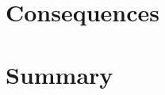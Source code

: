 \documentclass[prd,twocolumn,aps,nobibnotes,superscriptaddress,preprintnumbers,floatfix]{revtex4-1}
\begin{document}
\section{Consequences}

\section{Summary}


\end{document}

